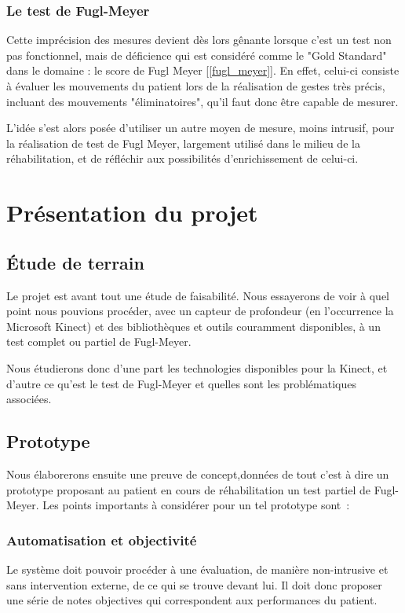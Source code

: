 \documentclass[french,12pt]{report}
\begin{document}
		\subsubsection{Le test de Fugl-Meyer}
Cette imprécision des mesures devient dès lors gênante lorsque c'est un test non pas fonctionnel, mais de déficience qui est considéré comme le "Gold Standard" dans le domaine : le score de Fugl Meyer [\ref{fugl_meyer}]. En effet, celui-ci consiste à évaluer les mouvements du patient lors de la réalisation de gestes très précis, incluant des mouvements "éliminatoires", qu'il faut donc être capable de mesurer.	
	
	L'idée s'est alors posée d'utiliser un autre moyen de mesure, moins intrusif, pour la réalisation de test de Fugl Meyer, largement utilisé dans le milieu de la réhabilitation, et de réfléchir aux possibilités d'enrichissement de celui-ci.
\newpage
		\section{Présentation du projet}
		
			\subsection{Étude de terrain} \label{etude_terrain}
		Le projet est avant tout une étude de faisabilité. Nous essayerons de voir
		à quel point nous pouvions procéder, avec un capteur de profondeur (en
		l'occurrence la Microsoft Kinect) et des bibliothèques et outils couramment 
		disponibles, à un test complet ou partiel de Fugl-Meyer.
		
		Nous étudierons donc d'une part les technologies disponibles pour la Kinect,
		et d'autre ce qu'est le test de Fugl-Meyer et quelles sont les 
		problématiques associées.
		
		\subsection{Prototype}
		Nous élaborerons ensuite une preuve de concept,données de tout c'est à dire un 
		prototype proposant au patient en cours de réhabilitation un test partiel 
		de Fugl-Meyer. Les points importants à considérer pour un tel prototype 
		sont~:
		\subsubsection{Automatisation et objectivité}
		Le système doit pouvoir procéder à une évaluation, de manière non-intrusive 
		et sans intervention externe, de ce qui se trouve devant lui. Il doit donc 
		proposer une série de notes objectives qui correspondent aux performances du 
		patient.
\end{document}
